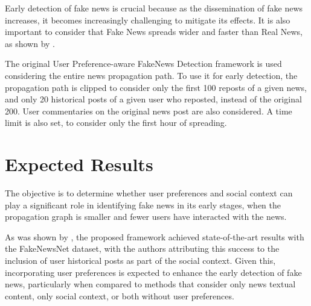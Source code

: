 \documentclass[12pt]{article}
\begin{document}
Early detection of fake news is crucial because as the dissemination of fake news increases, 
it becomes increasingly challenging to mitigate its effects. It is also important to consider that
Fake News spreads wider and faster than Real News, as shown by \cite{doi:10.1126/science.aap9559}.

The original User Preference-aware FakeNews Detection framework is used 
considering the entire news propagation path. 
To use it for early detection, the propagation path is clipped to consider only
the first 100 reposts of a given news, and only 20 historical posts of a given user who reposted, 
instead of the original 200. 
User commentaries on the original news post are also considered.
A time limit is also set, to consider only the first hour of spreading.


\section{Expected Results}

The objective is to determine whether user preferences and social context can play a 
significant role in identifying fake news in its early stages, 
when the propagation graph is smaller and fewer users have interacted with the news.

As was shown by \cite{dou2021user}, the proposed framework achieved state-of-the-art results
with the FakeNewsNet dataset, with the authors attributing this success to the 
inclusion of user historical posts as part of the social context. 
Given this, incorporating user preferences is expected to enhance the early detection of fake news, 
particularly when compared to methods that consider only news textual content, 
only social context, or both without user preferences.




\end{document}
